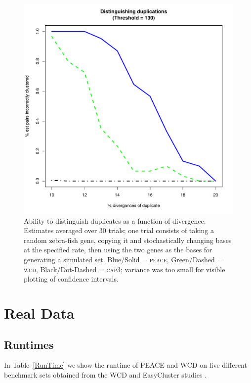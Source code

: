 \documentclass[a4paper,12pt]{article}
\newcommand{\peace} {{\small PEACE}}
\newcommand{\wcd} {{\small WCD}}
\begin{document}
\begin{appendix}
\begin{figure}[tbp]
\centerline{
\includegraphics[scale=0.35]{pics.d/duplicates_130.pdf}
}
\caption{Ability to distinguish duplicates as a function of
  divergence.  Estimates averaged over 30 trials; one trial consists
  of taking a random zebra-fish gene, copying it and stochastically changing bases
  at the specified rate, then using the two genes as the bases for
  generating a simulated set. Blue/Solid = \textsc{peace}, Green/Dashed = \textsc{wcd}, Black/Dot-Dashed = \textsc{cap3};
  variance was too small for visible plotting of
  confidence intervals.}\label{dups130}
\end{figure}


\section{Real Data}

\subsection{Runtimes}

In Table~\ref{RunTime} we show the runtime of \peace\/ and \wcd\/ on
five different benchmark sets obtained from the WCD and EasyCluster
studies \cite{Hazelhurst08a,Picardi09}. 


\end{appendix}
\end{document}
